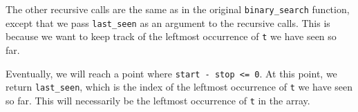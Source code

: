 \begin{prob}
\begin{soln}
        The other recursive calls are the same as in the original \texttt{binary_search}
        function, except that we pass \texttt{last_seen} as an argument
        to the recursive calls. This is because we want to keep track of the leftmost
        occurrence of \texttt{t} we have seen so far.

        Eventually, we will reach a point where \texttt{start - stop <= 0}.
        At this point, we return \texttt{last_seen}, which is the index
        of the leftmost occurrence of \texttt{t} we have seen so far.
        This will necessarily be the leftmost occurrence of \texttt{t}
        in the array.

    \end{soln}

\end{prob}
